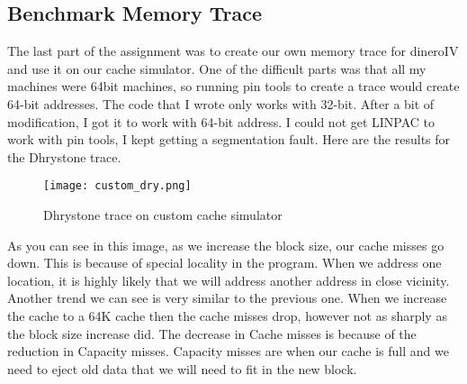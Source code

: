 \documentclass{article}
\begin{document}
    \subsection{Benchmark Memory Trace}
        The last part of the assignment was to create our own memory trace for dineroIV and use it on our cache simulator. One of the difficult parts was that all my machines were 64bit machines, so running pin tools to create a trace would create 64-bit addresses. The code that I wrote only works with 32-bit. After a bit of modification, I got it to work with 64-bit address. I could not get LINPAC to work with pin tools, I kept getting a segmentation fault. Here are the results for the Dhrystone trace.
        \begin{figure}[H]
            \label{fig:custom_dry}
            \begin{center}
                \texttt{[image: custom\_dry.png]}
                \caption{Dhrystone trace on custom cache simulator}
            \end{center}
        \end{figure}
        As you can see in this image, as we increase the block size, our cache misses go down. This is because of special locality in the program. When we address one location, it is highly likely that we will address another address in close vicinity. Another trend we can see is very similar to the previous one. When we increase the cache to a 64K cache then the cache misses drop, however not as sharply as the block size increase did. The decrease in Cache misses is because of the reduction in Capacity misses. Capacity misses are when our cache is full and we need to eject old data that we will need to fit in the new block.
\end{document}
